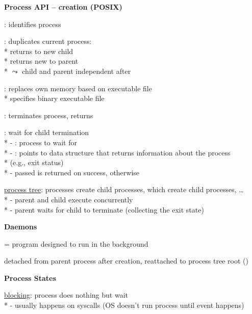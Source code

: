 \textbf{Process API -- creation (POSIX)}
\begin{items}
  \item {}: identifies process
  \item {}: duplicates current process: \\*
    returns  to new child \\*
    returns new  to parent \\*
    \( \leadsto \) child and parent independent after 
  \item {}: replaces own memory based on executable file \\*
     specifies binary executable file
  \item {}: terminates process, returns 
  \item {}: wait for child termination \\*
    - : process to wait for \\*
    - : points to data structure that returns information about the process \\*  (e.g., exit status) \\*
    - passed  is returned on success,  otherwise
  \item \underline{process tree}: processes create child processes, which create child processes, \dots \\*
    - parent and child execute concurrently \\*
    - parent waits for child to terminate (collecting the exit state)
\end{items}

\textbf{Daemons}
\begin{items}
  \item = program designed to run in the background
  \item detached from parent process after creation, reattached to process tree root ()
\end{items}

\textbf{Process States}
\begin{items}
  \item \underline{blocking}: process does nothing but wait \\*
    - usually happens on syscalls (OS doesn't run process until event happens)
\end{items}

